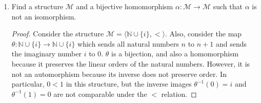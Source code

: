 \documentclass{article}
\begin{document}
\begin{enumerate}
    \begin{proof}
      $\mathcal{M}=\langle\mathbb{N},<\rangle$ is one such structure. Let
      $\alpha:\mathbb{N}\rightarrow\mathbb{N}$ be an automorphism. We show by
      induction on $n\in\mathbb{N}$ that $\alpha(n)=n$. For the base case,
      if $\alpha(0)=k>0$, then since automorphisms preserve relations, and
      $k-1<k$, we have $\alpha^{-1}(k-1)<\alpha^{-1}(k)=0$, which is not
      possible because nothing in $\mathbb{N}$ is smaller than $0$. Hence
      $\alpha(0)=0$. For the inductive step, assume $\alpha(k)=k$ for
      $k\leq n\in\mathbb{N}$. If $\alpha(n+1)=n+1+k$ for some $k>0$, then
      from $n+1<n+1+k$, we get, from the preservation of relations, that
      $\alpha^{-1}(n+1)<\alpha^{-1}(n+1+k)=n+1$. Yet $\alpha^{-1}(n+1)$
      must be greater than $n+1$ from inductive hypothesis, which is a
      contradiction. Hence $\alpha(n+1)=n+1$ as required, and $\alpha$ can
      only be the identity map.
    \end{proof}

  \item Find a structure $\mathcal{M}$ and a bijective homomorphism
    $\alpha:\mathcal{M}\rightarrow\mathcal{M}$ such that $\alpha$ is not an
    isomorphism.

    \begin{proof}
      Consider the structure
      $\mathcal{M}=\langle\mathbb{N}\cup\{i\},<\rangle$. Also,
      consider the map
      $\theta:\mathbb{N}\cup\{i\}\rightarrow\mathbb{N}\cup\{i\}$ which
      sends all natural numbers $n$ to $n+1$ and sends the imaginary number
      $i$ to 0. $\theta$ is a bijection, and also a homomorphism because
      it preserves the linear orders of the natural numbers. However, it is
      not an automorphism because its inverse does not preserve order. In
      particular, $0<1$ in this structure, but the inverse images
      $\theta^{-1}(0)=i$ and $\theta^{-1}(1)=0$ are not comparable under
      the $<$ relation.
    \end{proof}
\end{enumerate}
\end{document}
